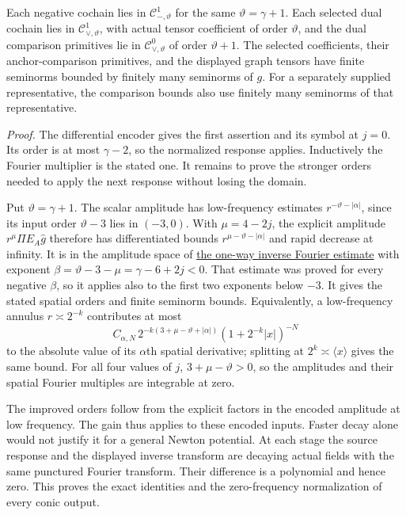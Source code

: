\documentclass[
  english,
  11pt,
  reqno]{amsart}
\begin{document}
Each negative cochain lies in \(\mathscr C_{-,\vartheta}^1\) for the
same \(\vartheta=\gamma+1\). Each selected dual cochain lies in
\(\mathscr C_{\vee,\vartheta}^1\), with actual tensor coefficient of
order \(\vartheta\), and the dual comparison primitives lie in
\(\mathscr C_{\vee,\vartheta}^0\) of order \(\vartheta+1\). The selected
coefficients, their anchor-comparison primitives, and the displayed
graph tensors have finite seminorms bounded by finitely many seminorms
of \(g\). For a separately supplied representative, the comparison
bounds also use finitely many seminorms of that representative.

\emph{Proof.} The differential encoder gives the first assertion and its
symbol at \(j=0\). Its order is at most \(\gamma-2\), so the normalized
response applies. Inductively the Fourier multiplier is the stated one.
It remains to prove the stronger orders needed to apply the next
response without losing the domain.

Put \(\vartheta=\gamma+1\). The scalar amplitude has low-frequency
estimates \(r^{-\vartheta-|\alpha|}\), since its input order
\(\vartheta-3\) lies in \((-3,0)\). With \(\mu=4-2j\), the explicit
amplitude \(r^\mu\Pi E_A\widehat g\) therefore has differentiated bounds
\(r^{\mu-\vartheta-|\alpha|}\) and rapid decrease at infinity. It is in
the amplitude space of
\hyperref[lem:online-decay-fourier-isomorphism]{the one-way inverse
Fourier estimate} with exponent \(\beta=\vartheta-3-\mu=\gamma-6+2j<0\).
That estimate was proved for every negative \(\beta\), so it applies
also to the first two exponents below \(-3\). It gives the stated
spatial orders and finite seminorm bounds. Equivalently, a low-frequency
annulus \(r\asymp2^{-k}\) contributes at most \[
C_{\alpha,N}\,
2^{-k(3+\mu-\vartheta+|\alpha|)}
(1+2^{-k}|x|)^{-N}
\] to the absolute value of its \(\alpha\)th spatial derivative;
splitting at \(2^k\asymp\langle x\rangle\) gives the same bound. For all
four values of \(j\), \(3+\mu-\vartheta>0\), so the amplitudes and their
spatial Fourier multiples are integrable at zero.

The improved orders follow from the explicit factors in the encoded
amplitude at low frequency. The gain thus applies to these encoded
inputs. Faster decay alone would not justify it for a general Newton
potential. At each stage the source response and the displayed inverse
transform are decaying actual fields with the same punctured Fourier
transform. Their difference is a polynomial and hence zero. This proves
the exact identities and the zero-frequency normalization of every conic
output.
\end{document}
